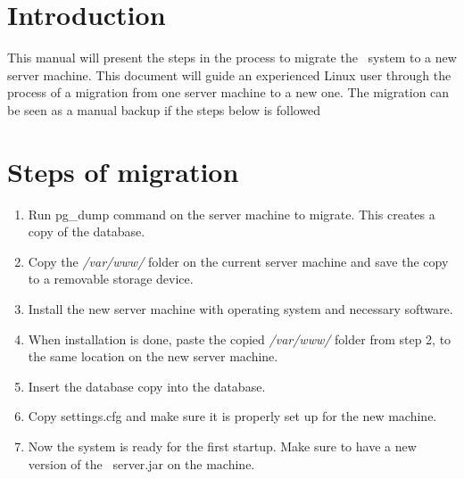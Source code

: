 \label{chap:exp_app_migration}
\section{Introduction}
This manual will present the steps in the process to migrate the \appName\ system to a new server machine. This document will guide an experienced Linux user through the process of a migration from one server machine to a new one. The migration can be seen as a manual backup if the steps below is followed

\section{Steps of migration}\label{sec:exp_steps}
\begin{enumerate}
	\item Run pg\_dump command on the server machine to migrate. This creates a copy of the database. 
	\item Copy the \emph{/var/www/} folder on the current server machine and save the copy to a removable storage device.
	\item Install the new server machine with operating system and necessary software. 
	\item When installation is done, paste the copied \emph{/var/www/} folder from step 2, to the same location on the new server machine. 
	\item Insert the database copy into the database.
	\item Copy settings.cfg and make sure it is properly set up for the new machine.
	\item Now the system is ready for the first startup. Make sure to have a new version of the \appName\ server.jar on the machine.
\end{enumerate}